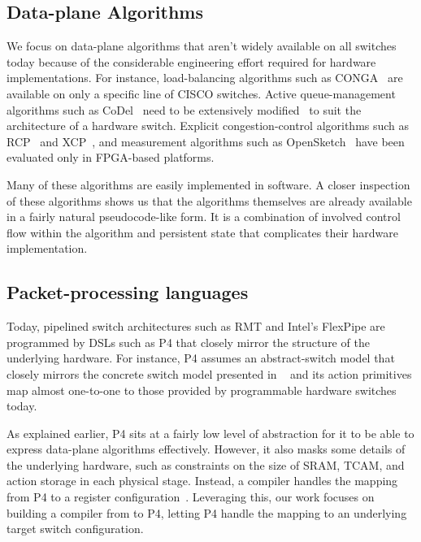 \subsection{Data-plane Algorithms}
\label{ss:data-plane}
 We focus on data-plane algorithms that aren't widely available on all switches
today because of the considerable engineering effort required for hardware
implementations. For instance, load-balancing algorithms such as
CONGA~\cite{conga} are available on only a specific line of CISCO switches.
Active queue-management algorithms such as CoDel~\cite{codel} need to be
extensively modified~\cite{pie} to suit the architecture of a hardware switch.
Explicit congestion-control algorithms such as RCP~\cite{rcp} and
XCP~\cite{xcp}, and measurement algorithms such as OpenSketch~\cite{opensketch}
have been evaluated only in FPGA-based platforms.

 Many of these algorithms are easily implemented in software. A closer
inspection of these algorithms shows us that the algorithms themselves are
already available in a fairly natural pseudocode-like form. It is a combination
of involved control flow within the algorithm and persistent state that
complicates their hardware implementation.

\subsection{Packet-processing languages}
\label{ss:languages}
 Today, pipelined switch architectures such as RMT and Intel's FlexPipe are
programmed by DSLs such as P4 that closely mirror the structure of the
underlying hardware. For instance, P4 assumes an abstract-switch model that
closely mirrors the concrete switch model presented in ~\cite{rmt} and its
action primitives map almost one-to-one to those provided by  programmable
hardware switches today.

 As explained earlier, P4 sits at a fairly low level of abstraction for it to
be able to express data-plane algorithms effectively. However, it also masks
some details of the underlying hardware, such as constraints on the size of
SRAM, TCAM, and action storage in each physical stage. Instead, a compiler
handles the mapping from P4 to a register configuration~\cite{lavanya}.
Leveraging this, our work focuses on building a compiler from \pktlanguage to
P4, letting P4 handle the mapping to an underlying target switch configuration.
